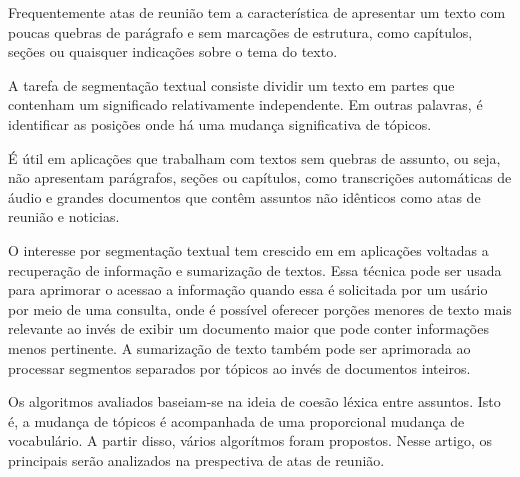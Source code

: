 Frequentemente atas de reunião tem a característica de apresentar um texto com poucas quebras de parágrafo e sem marcações de estrutura, como capítulos, seções ou quaisquer indicações sobre o tema do texto. 



A tarefa de segmentação textual consiste dividir um texto em partes que contenham um significado relativamente independente. Em outras palavras, é identificar as posições onde há uma mudança significativa de tópicos.

É útil em aplicações que trabalham com textos sem quebras de assunto, ou seja, não apresentam parágrafos, seções ou capítulos, como transcrições automáticas de áudio e grandes documentos que contêm assuntos não idênticos como atas de reunião e noticias.


O interesse por segmentação textual tem crescido em em aplicações voltadas a recuperação de informação %
e sumarização de textos. %
Essa técnica pode ser usada para aprimorar o acessao a informação quando essa é solicitada por um usário por meio de uma consulta, onde é possível oferecer porções menores de texto mais relevante ao invés de exibir um documento maior que pode conter informações menos pertinente. A sumarização de texto também pode ser aprimorada ao processar segmentos separados por tópicos ao invés de documentos inteiros.


Os algoritmos avaliados baseiam-se na ideia de coesão léxica entre assuntos. Isto é, a mudança de tópicos é acompanhada %
 de uma proporcional mudança de vocabulário. A partir disso, vários algorítmos foram propostos. Nesse artigo, os principais serão analizados na prespectiva de atas de reunião.
















